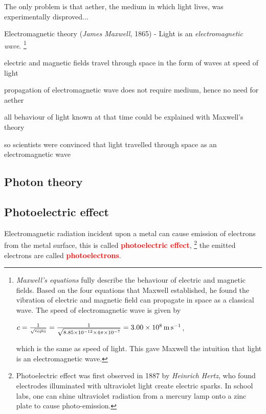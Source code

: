 \documentclass[a4paper,12pt]{book}
\newcommand{\keypoint}[1]{\textbf{\textcolor{red}{#1}}}
\newcommand{\mps}{\,\text{m\,s}^{-1}}
\newcommand{\keypoint}[1]{\textbf{\textcolor{red}{#1}}}
\begin{document}
The only problem is that aether, the medium in which light lives, was experimentally disproved...

Electromagnetic theory (\emph{James Maxwell}, 1865) - Light is an \emph{electromagnetic wave}.
\footnote{\emph{Maxwell's equations} fully describe the behaviour of electric and magnetic fields. Based on the four equations that Maxwell established, he found the vibration of electric and magnetic field can propagate in space as a classical wave. The speed of electromagnetic wave is given by
	
	{
		
		\centering
		
		$c=\frac{1}{\sqrt{\epsilon_0\mu_0}}=\frac{1}{\sqrt{8.85\times10^{-12}\times4\pi\times10^{-7}}} = 3.00 \times 10^8 \mps$,
		
	}
	
	\noindent which is the same as speed of light. This gave Maxwell the intuition that light is an electromagnetic wave.}

\begin{compactitem}
	\item[--] electric and magnetic fields travel through space in the form of waves at speed of light
	
	\item[--] propagation of electromagnetic wave does not require medium, hence no need for aether
	
\end{compactitem}

all behaviour of light known at that time could be explained with Maxwell's theory

so scientists were convinced that light travelled through space as an electromagnetic wave

\subsection{Photon theory}

\subsection{Photoelectric effect}\label{ch-photoelectricity}

Electromagnetic radiation incident upon a metal can cause emission of electrons from the metal surface, this is called \keypoint{photoelectric effect}, 
\footnote{Photoelectric effect was first observed in 1887 by \emph{Heinrich Hertz}, who found electrodes illuminated with ultraviolet light create electric sparks. In school labs, one can shine ultraviolet radiation from a mercury lamp onto a zinc plate to cause photo-emission.} the emitted electrons are called \keypoint{photoelectrons}.
\end{document}
